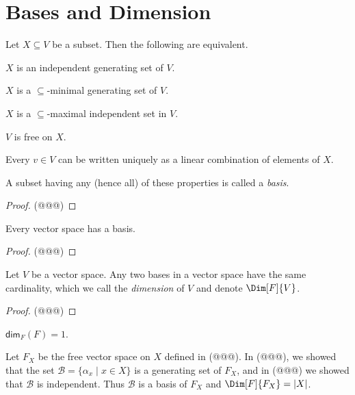 \section{Bases and Dimension}

\begin{prp}
Let $X \subseteq V$ be a subset. Then the following are equivalent.
\begin{enumerate*}
\item $X$ is an independent generating set of $V$.
\item $X$ is a $\subseteq$-minimal generating set of $V$.
\item $X$ is a $\subseteq$-maximal independent set in $V$.
\item $V$ is free on $X$.
\item Every $v \in V$ can be written uniquely as a linear combination of elements of $X$.
\end{enumerate*}
A subset having any (hence all) of these properties is called a \emph{basis}.
\end{prp}

\begin{proof}
(@@@)
\end{proof}

\begin{prp}
Every vector space has a basis.
\end{prp}

\begin{proof}
(@@@)
\end{proof}

\begin{prp}
Let $V$ be a vector space. Any two bases in a vector space have the same cardinality, which we call the \emph{dimension} of $V$ and denote $\Dim[F]{V}$.
\end{prp}

\begin{proof}
(@@@)
\end{proof}

\begin{exm}
\begin{enumerate*}
\item $\mathsf{dim}_F(F) = 1$.

\item Let $F_X$ be the free vector space on $X$ defined in (@@@). In (@@@), we showed that the set $\mathcal{B} = \{\alpha_x \mid x \in X\}$ is a generating set of $F_X$, and in (@@@) we showed that $\mathcal{B}$ is independent. Thus $\mathcal{B}$ is a basis of $F_X$ and $\Dim[F]{F_X} = |X|$.
\end{enumerate*}
\end{exm}

